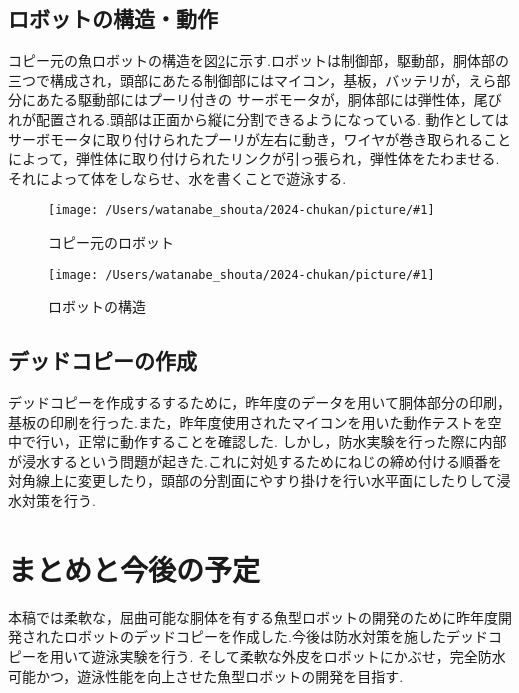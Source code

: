 \documentclass{jarticle}
\newcommand{\setPicture}[1]{\texttt{[image: /Users/watanabe\_shouta/2024-chukan/picture/\#1]}}
\begin{document}
\subsection{ロボットの構造・動作}
コピー元の魚ロボットの構造を図\ref{fig:structure}に示す.ロボットは制御部，駆動部，胴体部の三つで構成され，頭部にあたる制御部にはマイコン，基板，バッテリが，えら部分にあたる駆動部にはプーリ付きの
サーボモータが，胴体部には弾性体，尾びれが配置される.頭部は正面から縦に分割できるようになっている.
動作としてはサーボモータに取り付けられたプーリが左右に動き，ワイヤが巻き取られることによって，弾性体に取り付けられたリンクが引っ張られ，弾性体をたわませる.それによって体をしならせ、水を書くことで遊泳する.


\begin{figure}[t]
   \centering
   \setPicture{fish.jpg}
   \vspace*{-4mm}
   \caption{コピー元のロボット}
   \label{fig:fish-type}
\end{figure}

\begin{figure}[t]
   \centering
   \setPicture{tentativeschematic.png}
   \vspace*{-4mm}
   \caption{ロボットの構造}
   \label{fig:structure}
\end{figure}

\subsection{デッドコピーの作成}
デッドコピーを作成するするために，昨年度のデータを用いて胴体部分の印刷，基板の印刷を行った.また，昨年度使用されたマイコンを用いた動作テストを空中で行い，正常に動作することを確認した.
しかし，防水実験を行った際に内部が浸水するという問題が起きた.これに対処するためにねじの締め付ける順番を対角線上に変更したり，頭部の分割面にやすり掛けを行い水平面にしたりして浸水対策を行う.

\vspace*{-2mm}
\section{まとめと今後の予定}
本稿では柔軟な，屈曲可能な胴体を有する魚型ロボットの開発のために昨年度開発されたロボットのデッドコピーを作成した.今後は防水対策を施したデッドコピーを用いて遊泳実験を行う.
そして柔軟な外皮をロボットにかぶせ，完全防水可能かつ，遊泳性能を向上させた魚型ロボットの開発を目指す.
\end{document}
